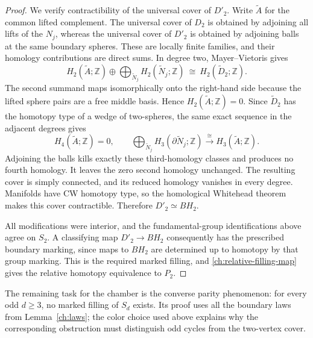 \begin{proof}
We verify contractibility of the universal cover of $D'_2$.
Write $\widetilde A$ for the common lifted complement.
The universal cover of $D_2$ is obtained by adjoining all
lifts of the $N_j$, whereas the universal cover of $D'_2$
is obtained by adjoining balls at the same boundary
spheres.  These are locally finite families, and their
homology contributions are direct sums.  In degree two,
Mayer--Vietoris gives
\[
 H_2(\widetilde A;\mathbb Z)\oplus
       \bigoplus_{\widetilde N_j}H_2(\widetilde N_j;\mathbb Z)
       \ \cong\ H_2(\widetilde D_2;\mathbb Z).
\]
The second summand maps isomorphically onto the right-hand
side because the lifted sphere pairs are a free middle
basis.  Hence $H_2(\widetilde A;\mathbb Z)=0$.
Since $\widetilde D_2$ has the homotopy type of a wedge of
two-spheres, the same exact sequence in the adjacent
degrees gives
\[
 H_4(\widetilde A;\mathbb Z)=0,\qquad
 \bigoplus_{\widetilde N_j}H_3(\partial\widetilde N_j;\mathbb Z)
      \xrightarrow{\ \cong\ }H_3(\widetilde A;\mathbb Z).
\]
Adjoining the balls kills exactly these third-homology
classes and produces no fourth homology.  It leaves the
zero second homology unchanged.  The resulting cover is
simply connected, and its reduced homology vanishes in
every degree.  Manifolds have CW homotopy type, so the
homological Whitehead theorem makes this cover
contractible.  Therefore $D'_2\simeq BH_2$.

All modifications were interior, and the fundamental-group
identifications above agree on $S_2$.  A classifying map
$D'_2\to BH_2$ consequently has the prescribed boundary
marking, since maps to $BH_2$ are determined up to homotopy
by that group marking.  This is the required marked
filling, and \eqref{ch:relative-filling-map} gives the
relative homotopy equivalence to $P_2$.
\end{proof}

The remaining task for the chamber is the converse parity
phenomenon: for every odd $d\geq3$, no marked filling of
$S_d$ exists.  Its proof uses all the boundary laws from
Lemma~\ref{ch:laws}; the color choice used above explains
why the corresponding obstruction must distinguish odd
cycles from the two-vertex cover.

